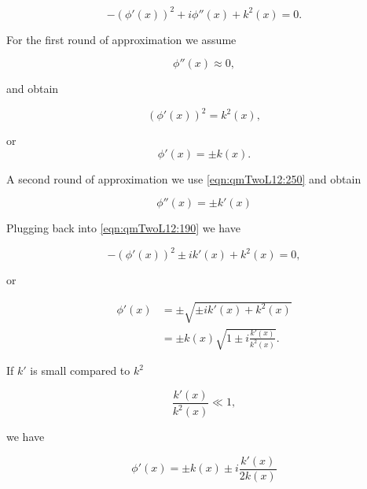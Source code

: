 \begin{equation}\label{eqn:qmTwoL12:190}
- (\phi'(x))^2 + i \phi''(x) + k^2(x) = 0.
\end{equation}

For the first round of approximation we assume

\begin{equation}\label{eqn:qmTwoL12:210}
\phi''(x) \approx 0,
\end{equation}

and obtain

\begin{equation}\label{eqn:qmTwoL12:230}
(\phi'(x))^2 = k^2(x),
\end{equation}

or
\begin{equation}\label{eqn:qmTwoL12:250}
\phi'(x) = \pm k(x).
\end{equation}

A second round of approximation we use \ref{eqn:qmTwoL12:250} and obtain

\begin{equation}\label{eqn:qmTwoL12:250b}
\phi''(x) = \pm k'(x)
\end{equation}

Plugging back into \ref{eqn:qmTwoL12:190} we have

\begin{equation}\label{eqn:qmTwoL12:270}
-(\phi'(x))^2 \pm i k'(x) + k^2(x) = 0,
\end{equation}

or

\begin{equation}\label{eqn:qmTwoL12:290}
\begin{aligned}
\phi'(x) 
&= \pm \sqrt{ \pm i k'(x) + k^2(x) } \\
&= \pm k(x) \sqrt{ 1 \pm i \frac{k'(x)}{k^2(x)} } .
\end{aligned}
\end{equation}

If $k'$ is small compared to $k^2$

\begin{equation}\label{eqn:qmTwoL12:310}
\frac{k'(x)}{k^2(x)} \ll 1, 
\end{equation}

we have

\begin{equation}\label{eqn:qmTwoL12:330}
\phi'(x) 
= \pm k(x) \pm i \frac{k'(x)}{2 k(x)}  
\end{equation}

